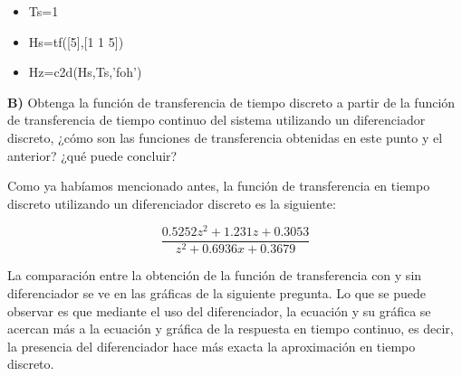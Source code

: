 \begin{itemize}
	\item Ts=1
	\item Hs=tf([5],[1 1 5])
	\item Hz=c2d(Hs,Ts,'foh')
\end{itemize}

\textbf{B)}  Obtenga la función de transferencia de tiempo discreto a partir de la función de transferencia de tiempo continuo del sistema utilizando un diferenciador discreto, ¿cómo son las funciones de transferencia obtenidas en este punto y el anterior? ¿qué puede concluir?

Como ya habíamos mencionado antes, la función de transferencia en tiempo discreto utilizando un diferenciador discreto es la siguiente:

\begin{equation}
	\frac{0.5252z^2+1.231z+0.3053}{z^2 +0.6936x + 0.3679}
\end{equation}

La comparación entre la obtención de la función de transferencia con y sin diferenciador se ve en las gráficas de la siguiente pregunta. Lo que se puede observar es que mediante el uso del diferenciador, la ecuación y su gráfica se acercan más a la ecuación y gráfica de la respuesta en tiempo continuo, es decir, la presencia del diferenciador hace más exacta la aproximación en tiempo discreto.